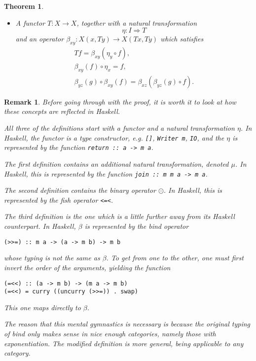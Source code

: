 \documentclass[11pt]{article}
\newtheorem{theorem}{Theorem}
\newtheorem{remark}{Remark}
\theoremstyle{nonumberplain}
\newcommand*\lsin{\lstinline}
\begin{document}
\begin{theorem}
\begin{itemize}
\item A functor $T \colon X \to X$, together with a natural transformation
\begin{equation}
\eta \colon I \Rightarrow T
\end{equation}
and an operator $\beta_{xy} \colon X(x, Ty) \to X(Tx, Ty)$ which satisfies
\begin{gather}
Tf = \beta_{xy}(\eta_y \circ f),\label{eq:beta1}\\
\beta_{xy}(f) \circ \eta_x = f,\label{eq:beta2}\\
\beta_{yz}(g) \circ \beta_{xy}(f) = \beta_{xz}(\beta_{yz}(g) \circ f).\label{eq:beta3}
\end{gather}
\end{itemize}
\end{theorem}

\begin{remark}
Before going through with the proof, it is worth it to look at how these concepts are reflected in Haskell.

All three of the definitions start with a functor and a natural transformation $\eta$. In Haskell, the functor is a type constructor, e.g. \lsin|[]|, \lsin|Writer m|, \lsin|IO|, and the $\eta$ is represented by the function \lsin|return :: a -> m a|.

The first definition contains an additional natural transformation, denoted $\mu$. In Haskell, this is represented by the function \lsin|join :: m m a -> m a|.

The second definition contains the binary operator $\odot$. In Haskell, this is represented by the fish operator \lsin|<=<|.

The third definition is the one which is a little further away from its Haskell counterpart. In Haskell, $\beta$ is represented by the bind operator
\begin{lstlisting}
(>>=) :: m a -> (a -> m b) -> m b
\end{lstlisting}
whose typing is not the same as $\beta$. To get from one to the other, one must first invert the order of the arguments, yielding the function
\begin{lstlisting}
(=<<) :: (a -> m b) -> (m a -> m b)
(=<<) = curry ((uncurry (>>=)) . swap)
\end{lstlisting}

This one maps directly to $\beta$.

The reason that this mental gymnastics is necessary is because the original typing of bind only makes sense in nice enough categories, namely those with exponentiation. The modified definition is more general, being applicable to any category.
\end{remark}
\end{document}
